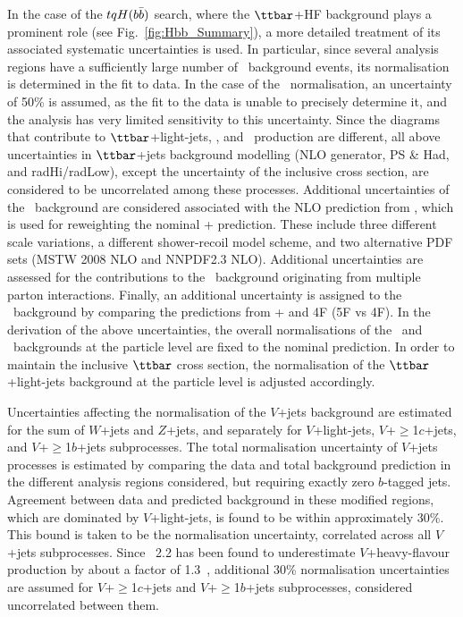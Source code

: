In the case of the $tqH(b\bar{b})$ search, where the $\ttbar$+HF background plays a prominent role (see Fig.~\ref{fig:Hbb_Summary}), a more 
detailed treatment of its associated systematic uncertainties is used. In particular, since several analysis 
regions have a sufficiently large number of \ttbin\ background events, its normalisation is 
determined in the fit to data.
In the case of the \ttcin\ normalisation, an uncertainty of 50\% is assumed, as the fit to the data is unable 
to precisely determine it, and the analysis has very limited sensitivity to this uncertainty.
Since the diagrams that contribute to $\ttbar$+light-jets, \ttcin, and \ttbin\
production are different, all above uncertainties in $\ttbar$+jets
background modelling (NLO generator, PS \& Had, and radHi/radLow), except the uncertainty of the inclusive cross section, are
considered to be uncorrelated among these processes.
Additional uncertainties of the \ttbin\ background are considered associated with the NLO prediction from {\ShOL}, 
which is used for reweighting the nominal {\powheg}+{\pythiaeight} prediction. 
These include three different scale variations, a different shower-recoil model scheme, and 
two alternative PDF sets (MSTW 2008 NLO and NNPDF2.3 NLO). Additional uncertainties are assessed for
the contributions to the \ttbin\ background originating from multiple parton interactions.
Finally, an additional uncertainty is assigned to the \ttbin\ background by comparing
the predictions from {\powheg}+{\pythiaeight} and {\ShOL} 4F (5F vs 4F).
In the derivation of the above uncertainties, the overall normalisations of the \ttcin\ and \ttbin\ backgrounds 
at the particle level are fixed to the nominal prediction. In order to maintain the inclusive $\ttbar$ cross section, 
the normalisation of the $\ttbar$+light-jets background at the particle level is adjusted accordingly.

Uncertainties affecting the normalisation of the $V$+jets background are estimated for the sum
of $W$+jets and $Z$+jets, and separately for $V$+light-jets, $V$+$\geq$1$c$+jets, and $V$+$\geq$1$b$+jets subprocesses.
The total normalisation uncertainty of $V$+jets processes is estimated by comparing the data and total background prediction in 
the different analysis regions considered, but requiring exactly zero $b$-tagged jets. Agreement between data and predicted background 
in these modified regions, which are dominated by $V$+light-jets, is found to be within approximately 30\%. This bound is taken to 
be the normalisation uncertainty, correlated across all $V$+jets subprocesses. 
Since {\sherpa}~2.2 has been found to underestimate $V$+heavy-flavour production by about a factor
of 1.3~\cite{Aaboud:2017xsd}, additional 30\% normalisation uncertainties are assumed for $V$+$\geq$1$c$+jets and $V$+$\geq$1$b$+jets
subprocesses, considered uncorrelated between them.

